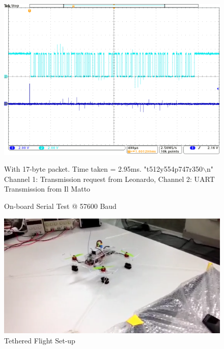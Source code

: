 \documentclass[a4paper,11pt]{article}
\begin{document}
\begin{figure}[!ht]
    \includegraphics[width=\textwidth]{57600_baud_comms.png}
    \caption{On-board Serial Test @ 57600 Baud}
    \medskip
    \small
    \centering
    With 17-byte packet. Time taken = 2.95ms. "t512y554p747r350$\backslash$n" \\Channel 1: Transmission request from Leonardo, Channel 2: UART Transmission from Il Matto
    \label{fig:57600 Baud}
\end{figure}
\begin{figure}[!ht]
    \includegraphics[width=\textwidth]{tethered.png}
    \caption{Tethered Flight Set-up}
    \label{fig:Tethered}
\end{figure}
\end{document}
